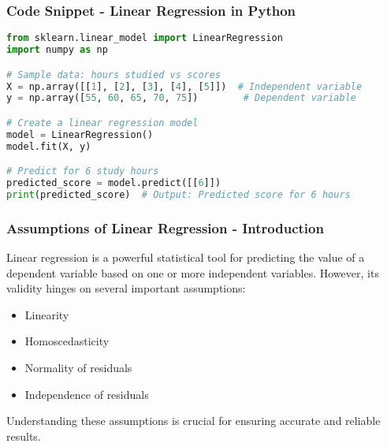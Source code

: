 \documentclass[aspectratio=169]{beamer}
\begin{document}
\begin{frame}[fragile]
    \frametitle{Code Snippet - Linear Regression in Python}
    \begin{lstlisting}[language=Python]
from sklearn.linear_model import LinearRegression
import numpy as np

# Sample data: hours studied vs scores
X = np.array([[1], [2], [3], [4], [5]])  # Independent variable
y = np.array([55, 60, 65, 70, 75])        # Dependent variable

# Create a linear regression model
model = LinearRegression()
model.fit(X, y)

# Predict for 6 study hours
predicted_score = model.predict([[6]])
print(predicted_score)  # Output: Predicted score for 6 hours
    \end{lstlisting}
\end{frame}

\begin{frame}[fragile]
    \frametitle{Assumptions of Linear Regression - Introduction}
    Linear regression is a powerful statistical tool for predicting the value of a dependent variable based on one or more independent variables. 
    However, its validity hinges on several important assumptions:
    \begin{itemize}
        \item Linearity
        \item Homoscedasticity
        \item Normality of residuals
        \item Independence of residuals
    \end{itemize}
    Understanding these assumptions is crucial for ensuring accurate and reliable results.
\end{frame}
\end{document}
